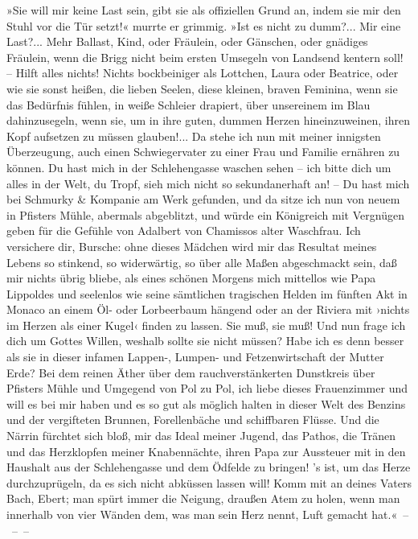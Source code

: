 »Sie will mir keine Last sein, gibt sie als offiziellen Grund an,
indem sie mir den Stuhl vor die Tür setzt!« murrte er grimmig. »Ist
es nicht zu dumm?... Mir eine Last?... Mehr Ballast, Kind, oder
Fräulein, oder Gänschen, oder gnädiges Fräulein, wenn die Brigg
nicht beim ersten Umsegeln von Landsend kentern soll! – Hilft alles
nichts! Nichts bockbeiniger als Lottchen, Laura oder Beatrice, oder
wie sie sonst heißen, die lieben Seelen, diese kleinen, braven
Feminina, wenn sie das Bedürfnis fühlen, in weiße Schleier
drapiert, über unsereinem im Blau dahinzusegeln, wenn sie, um in
ihre guten, dummen Herzen hineinzuweinen, ihren Kopf aufsetzen zu
müssen glauben!... Da stehe ich nun mit meiner innigsten
Überzeugung, auch einen Schwiegervater zu einer Frau und Familie
ernähren zu können. Du hast mich in der Schlehengasse waschen sehen
– ich bitte dich um alles in der Welt, du Tropf, sieh mich nicht so
sekundanerhaft an! – Du hast mich bei Schmurky \& Kompanie am Werk
gefunden, und da sitze ich nun von neuem in Pfisters Mühle,
abermals abgeblitzt, und würde ein Königreich mit Vergnügen geben
für die Gefühle von Adalbert von Chamissos alter Waschfrau. Ich
versichere dir, Bursche: ohne dieses Mädchen wird mir das Resultat
meines Lebens so stinkend, so widerwärtig, so über alle Maßen
abgeschmackt sein, daß mir nichts übrig bliebe, als eines schönen
Morgens mich mittellos wie Papa Lippoldes und seelenlos wie seine
sämtlichen tragischen Helden im fünften Akt in Monaco an einem Öl-
oder Lorbeerbaum hängend oder an der Riviera mit ›nichts im Herzen
als einer Kugel‹ finden zu lassen. Sie muß, sie muß! Und nun frage
ich dich um Gottes Willen, weshalb sollte sie nicht müssen? Habe
ich es denn besser als sie in dieser infamen Lappen-, Lumpen- und
Fetzenwirtschaft der Mutter Erde? Bei dem reinen Äther über dem
rauchverstänkerten Dunstkreis über Pfisters Mühle und Umgegend von
Pol zu Pol, ich liebe dieses Frauenzimmer und will es bei mir haben
und es so gut als möglich halten in dieser Welt des Benzins und der
vergifteten Brunnen, Forellenbäche und schiffbaren Flüsse. Und die
Närrin fürchtet sich bloß, mir das Ideal meiner Jugend, das Pathos,
die Tränen und das Herzklopfen meiner Knabennächte, ihren Papa zur
Aussteuer mit in den Haushalt aus der Schlehengasse und dem Ödfelde
zu bringen! 's ist, um das Herze durchzuprügeln, da es sich nicht
abküssen lassen will! Komm mit an deines Vaters Bach, Ebert; man
spürt immer die Neigung, draußen Atem zu holen, wenn man innerhalb
von vier Wänden dem, was man sein Herz nennt, Luft gemacht
hat.«~–~–~–

